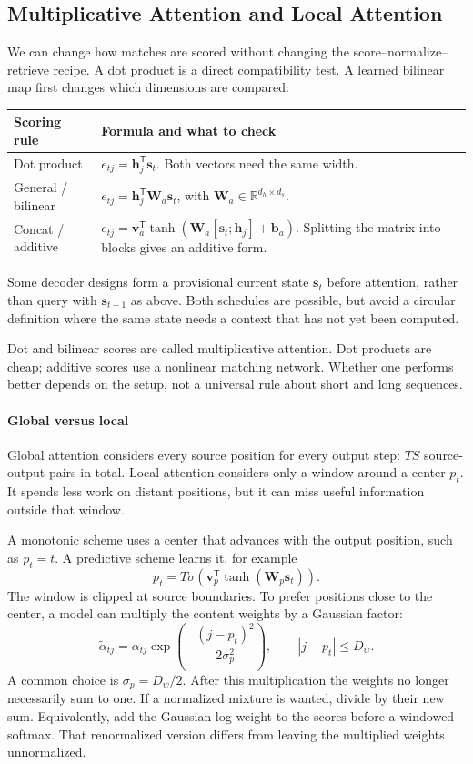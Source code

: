 \documentclass[11pt, oneside]{book}
\newcommand{\R}{\mathbb{R}}
\newcommand{\T}{^{\mathsf{T}}}           %
\let\originalsubsection\subsection
\renewcommand{\subsection}{\Needspace{6\baselineskip}\originalsubsection}
\begin{document}
\subsection{Multiplicative Attention and Local Attention}\label{sec:source-4-2-2}
We can change how matches are scored without changing the score--normalize--retrieve recipe. A dot product is a direct compatibility test. A learned bilinear map first changes which dimensions are compared:
\begin{center}
\small
\begin{tabular}{@{}lp{9.2cm}@{}}
\toprule
Scoring rule & Formula and what to check \\\midrule
Dot product & $e_{tj}=\mathbf{h}_j\T\mathbf{s}_t$. Both vectors need the same width. \\
General / bilinear & $e_{tj}=\mathbf{h}_j\T\mathbf{W}_a\mathbf{s}_t$, with $\mathbf{W}_a\in\R^{d_h\times d_s}$. \\
Concat / additive & $e_{tj}=\mathbf{v}_a\T\tanh(\mathbf{W}_a[\mathbf{s}_t;\mathbf{h}_j]+\mathbf{b}_a)$. Splitting the matrix into blocks gives an additive form. \\\bottomrule
\end{tabular}
\end{center}
Some decoder designs form a provisional current state $\mathbf{s}_t$ before attention, rather than query with $\mathbf{s}_{t-1}$ as above. Both schedules are possible, but avoid a circular definition where the same state needs a context that has not yet been computed.

Dot and bilinear scores are called multiplicative attention. Dot products are cheap; additive scores use a nonlinear matching network. Whether one performs better depends on the setup, not a universal rule about short and long sequences.

\paragraph{Global versus local} Global attention considers every source position for every output step: $TS$ source-output pairs in total. Local attention considers only a window around a center $p_t$. It spends less work on distant positions, but it can miss useful information outside that window.

A monotonic scheme uses a center that advances with the output position, such as $p_t=t$. A predictive scheme learns it, for example
\[
 p_t=T\sigma\!\left(\mathbf{v}_p\T\tanh(\mathbf{W}_p\mathbf{s}_t)\right).
\]
The window is clipped at source boundaries. To prefer positions close to the center, a model can multiply the content weights by a Gaussian factor:
\[
 \widetilde\alpha_{tj}=\alpha_{tj}
       \exp\!\left(-\frac{(j-p_t)^2}{2\sigma_p^2}\right),\qquad |j-p_t|\leq D_w.
\]
A common choice is $\sigma_p=D_w/2$. After this multiplication the weights no longer necessarily sum to one. If a normalized mixture is wanted, divide by their new sum. Equivalently, add the Gaussian log-weight to the scores before a windowed softmax. That renormalized version differs from leaving the multiplied weights unnormalized.
\end{document}
